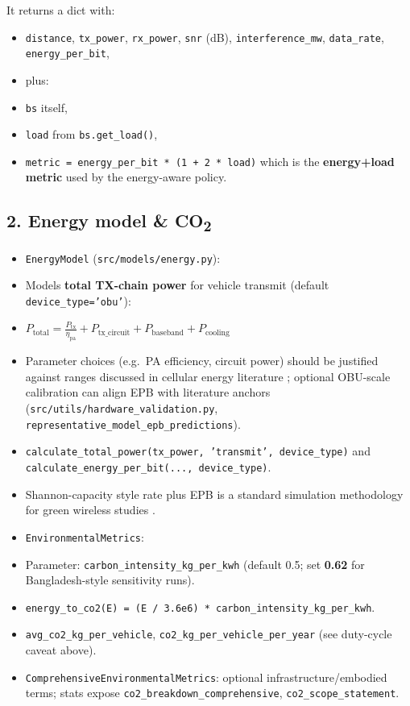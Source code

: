 \documentclass[conference]{IEEEtran}
\begin{document}
It returns a dict with:
\begin{itemize}
\item \texttt{distance}, \texttt{tx\_power}, \texttt{rx\_power}, \texttt{snr} (dB), \texttt{interference\_mw}, \texttt{data\_rate}, \texttt{energy\_per\_bit},
\item plus:
\item \texttt{bs} itself,
\item \texttt{load} from \texttt{bs.get\_load()},
\item \texttt{metric = energy\_per\_bit * (1 + 2 * load)} which is the \textbf{energy+load metric} used by the energy-aware policy.
\end{itemize}


\subsection{2. Energy model \& CO\textsubscript{2}}
\begin{itemize}
\item \texttt{EnergyModel} (\texttt{src/models/energy.py}):
\item Models \textbf{total TX-chain power} for vehicle transmit (default \texttt{device\_type='obu'}):
\item \( P_\text{total} = \frac{P_\text{tx}}{\eta_\text{pa}} + P_\text{tx\_circuit} + P_\text{baseband} + P_\text{cooling} \)
\item Parameter choices (e.g.\ PA efficiency, circuit power) should be justified against ranges discussed in cellular energy literature \cite{auer2011howmuch,hasan2011green}; optional OBU-scale calibration can align EPB with literature anchors (\texttt{src/utils/hardware\_validation.py}, \texttt{representative\_model\_epb\_predictions}).
\item \texttt{calculate\_total\_power(tx\_power, 'transmit', device\_type)} and \texttt{calculate\_energy\_per\_bit(..., device\_type)}.
\item Shannon-capacity style rate plus EPB is a standard simulation methodology for green wireless studies \cite{chen2011fundamental}.
\item \texttt{EnvironmentalMetrics}:
\item Parameter: \texttt{carbon\_intensity\_kg\_per\_kwh} (default 0.5; set \textbf{0.62} for Bangladesh-style sensitivity runs).
\item \texttt{energy\_to\_co2(E) = (E / 3.6e6) * carbon\_intensity\_kg\_per\_kwh}.
\item \texttt{avg\_co2\_kg\_per\_vehicle}, \texttt{co2\_kg\_per\_vehicle\_per\_year} (see duty-cycle caveat above).
\item \texttt{ComprehensiveEnvironmentalMetrics}: optional infrastructure/embodied terms; stats expose \texttt{co2\_breakdown\_comprehensive}, \texttt{co2\_scope\_statement}.
\end{itemize}
\end{document}
